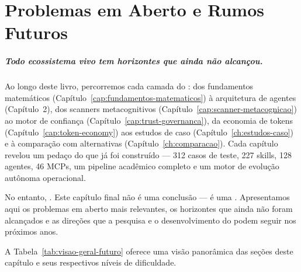 \chapter{Problemas em Aberto e Rumos Futuros}
\label{ch:futuro}

\paragraph{Todo ecossistema vivo tem horizontes que ainda não alcançou.}
Ao longo deste livro, percorremos cada camada do \opencodeeco{}:
dos fundamentos matemáticos (Capítulo~\ref{cap:fundamentos-matematicos})
à arquitetura de agentes (Capítulo~2), dos scanners
metacognitivos (Capítulo~\ref{cap:scanner-metacognicao}) ao motor de
confiança (Capítulo~\ref{cap:trust-governanca}), da economia de tokens
(Capítulo~\ref{cap:token-economy}) aos estudos de caso
(Capítulo~\ref{ch:estudos-caso}) e à comparação com alternativas
(Capítulo~\ref{ch:comparacao}). Cada capítulo revelou um pedaço do que já
foi construído --- 312 casos de teste, 227 skills, 128 agentes, 46 MCPs,
um pipeline acadêmico completo e um motor de evolução autônoma
operacional.

No entanto, .
Este capítulo final não é uma conclusão --- é uma .
Apresentamos aqui os problemas em aberto mais relevantes, os horizontes
que ainda não foram alcançados e as direções que a pesquisa e o
desenvolvimento do \opencodeeco{} podem seguir nos próximos anos.

A Tabela~\ref{tab:visao-geral-futuro} oferece uma visão panorâmica das
seções deste capítulo e seus respectivos níveis de dificuldade.

